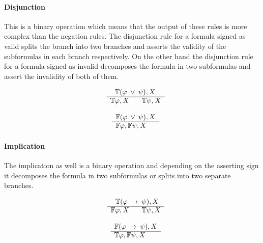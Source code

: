 \documentclass{article}
\begin{document}
		\paragraph{Disjunction}
This is a binary operation which means that the output of these rules is more complex than the negation rules.
The disjunction rule for a formula signed as valid splits the branch into two branches and asserts the validity of the subformulas in each branch respectively.
On the other hand the disjunction rule for a formula signed as invalid decomposes the formula in two subformulas and assert the invalidity of both of them.
		\newline
		\noindent\begin{minipage}{.5\linewidth}
		\begin{align*}
			\begin{array}{rl}
				& \:\:\: \mathbb{T}(\varphi \: \vee \: \psi), X \\
			      \cline{2-2}
			      & \mathbb{T}\varphi, X \:\:\:\:\:\:\:\: \mathbb{T}\psi, X
			\end{array}
		\end{align*}
		\end{minipage}%
		\begin{minipage}{.5\linewidth}
		\begin{align*}
			\begin{array}{rl}
				& \mathbb{F}(\varphi \: \vee \: \psi), X \\
			      \cline{2-2}
			      & \mathbb{F}\varphi, \mathbb{F}\psi, X
			\end{array}
		\end{align*}
		\end{minipage}
		
		\paragraph{Implication}
The implication as well is a binary operation and depending on the asserting sign it decomposes the formula in two subformulas or splits into two separate branches.
		\newline
		\noindent\begin{minipage}{.5\linewidth}
		\begin{align*}
			\begin{array}{rl}
				& \:\:\: \mathbb{T}(\varphi \: \rightarrow \: \psi), X \\
			      \cline{2-2}
			      & \mathbb{F}\varphi, X \:\:\:\:\:\:\:\: \mathbb{T}\psi, X
			\end{array}
		\end{align*}
		\end{minipage}%
		\begin{minipage}{.5\linewidth}
		\begin{align*}
			\begin{array}{rl}
				& \mathbb{F}(\varphi \: \rightarrow \: \psi), X \\
			      \cline{2-2}
			      & \mathbb{T}\varphi, \mathbb{F}\psi, X
			\end{array}
		\end{align*}
		\end{minipage}
		
\end{document}
